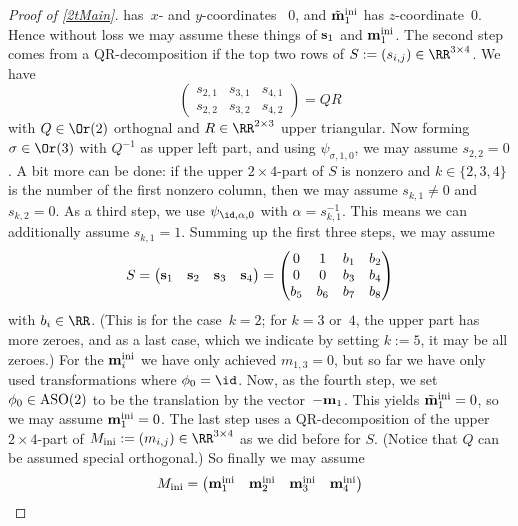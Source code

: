 \documentclass[reqno]{amsart}
\begin{document}
\begin{proof}[Proof of \cref{2tMain}]
  has~$x$- and $y$-coordinates ~$0$, and $\tilde{\mathbf{m}}_1^{\operatorname{ini}}$ has
  $z$-coordinate~$0$. Hence without loss we may assume these things of
  $\mathbf{s}_1$ and $\mathbf{m}_1^{\operatorname{ini}}$. The second step comes from a
  QR-decomposition if the top two rows of
  $S := (s_{i,j}) \in \RR^{3 \times 4}$. We have
  \[
    \begin{pmatrix}
      s_{2,1} & s_{3,1} & s_{4,1} \\
      s_{2,2} & s_{3,2} & s_{4,2}
    \end{pmatrix}
    = Q R
  \]
  with $Q \in \Or(2)$ orthognal and $R \in \RR^{2 \times 3}$ upper
  triangular. Now forming~$\sigma \in \Or(3)$ with $Q^{-1}$ as upper
  left part, and using $\psi_{\sigma,1,0}$, we may assume
  $s_{2,2} = 0$. A bit more can be done: if the upper
  $2 \times 4$-part of $S$ is nonzero and $k \in \{2,3,4\}$ is the
  number of the first nonzero column, then we may assume
  $s_{k,1} \ne 0$ and $s_{k,2} = 0$. As a third step, we use
  $\psi_{\id,\alpha,0}$ with $\alpha = s_{k,1}^{-1}$. This means we
  can additionally assume $s_{k,1} = 1$. Summing up the first three
  steps, we may assume
  \begin{equation} \label{eqS}%
    S = \begin{pmatrix}
      \ve s_1 & \ve s_2 & \ve s_3 & \ve s_4
    \end{pmatrix} =
    \begin{pmatrix}
      0 & 1 & b_1 & b_2 \\
      0 & 0 & b_3 & b_4 \\
      b_5 & b_6 & b_7 & b_8
    \end{pmatrix}
  \end{equation}
  with $b_i \in \RR$. (This is for the case~$k = 2$; for $k = 3$
  or~$4$, the upper part has more zeroes, and as a last case, which we
  indicate by setting $k := 5$, it may be all zeroes.) For the
  $\mathbf{m}_i^{\operatorname{ini}}$ we have only achieved $m_{1,3} = 0$, but so far we
  have only used transformations where $\phi_0 = \id$. Now, as the
  fourth step, we set $\phi_0 \in \operatorname{ASO}(2)$ to be the translation by
  the vector~$- \mathbf{m}_1$. This yields $\tilde{\mathbf{m}}_1^{\operatorname{ini}} = 0$, so
  we may assume $\mathbf{m}_1^{\operatorname{ini}} = 0$. The last step uses a
  QR-decomposition of the upper $2 \times 4$-part of
  $M_\ini := (m_{i,j}) \in \RR^{3 \times 4}$ as we did before for
  $S$. (Notice that $Q$ can be assumed special orthogonal.) So finally
  we may assume
  \begin{equation} \label{eqM}%
    M_\ini=
    \begin{pmatrix}
      \ve m^\ini_1 & \ve m^\ini_2 & \ve m^\ini_3 & \ve m^\ini_4

\end{pmatrix}
\end{equation}
\end{proof}
\end{document}
